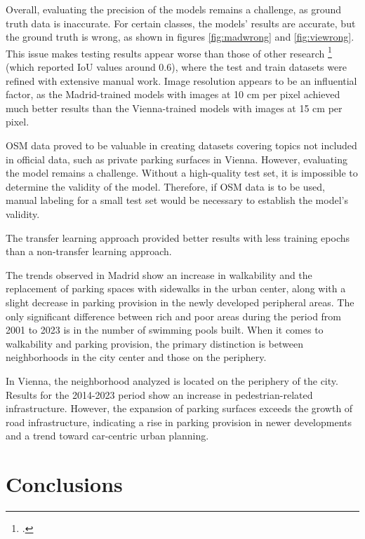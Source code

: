 \begin{refsection}
Overall, evaluating the precision of the models remains a challenge, as ground truth data is inaccurate. For certain classes, the models' results are accurate, but the ground truth is wrong, as shown in figures \ref{fig:madwrong} and \ref{fig:viewrong}. This issue makes testing results appear worse than those of other research \footcite{henry_citywide_2021} (which reported IoU values around 0.6), where the test and train datasets were refined with extensive manual work. Image resolution appears to be an influential factor, as the Madrid-trained models with images at 10 cm per pixel achieved much better results than the Vienna-trained models with images at 15 cm per pixel. 


OSM data proved to be valuable in creating datasets covering topics not included in official data, such as private parking surfaces in Vienna. However, evaluating the model remains a challenge. Without a high-quality test set, it is impossible to determine the validity of the model. Therefore, if OSM data is to be used, manual labeling for a small test set would be necessary to establish the model's validity. 

The transfer learning approach provided better results with less training epochs than a non-transfer learning approach. 


The trends observed in Madrid show an increase in walkability and the replacement of parking spaces with sidewalks in the urban center, along with a slight decrease in parking provision in the newly developed peripheral areas. The only significant difference between rich and poor areas during the period from 2001 to 2023 is in the number of swimming pools built. When it comes to walkability and parking provision, the primary distinction is between neighborhoods in the city center and those on the periphery.

In Vienna, the neighborhood analyzed is located on the periphery of the city. Results for the 2014-2023 period show an increase in pedestrian-related infrastructure. However, the expansion of parking surfaces exceeds the growth of road infrastructure, indicating a rise in parking provision in newer developments and a trend toward car-centric urban planning.

\renewcommand{\sectionnametext}{Conclusions}
\renewcommand{\headingtextR}{\thesection. \sectionnametext}
\section{\sectionnametext}


\end{refsection}
